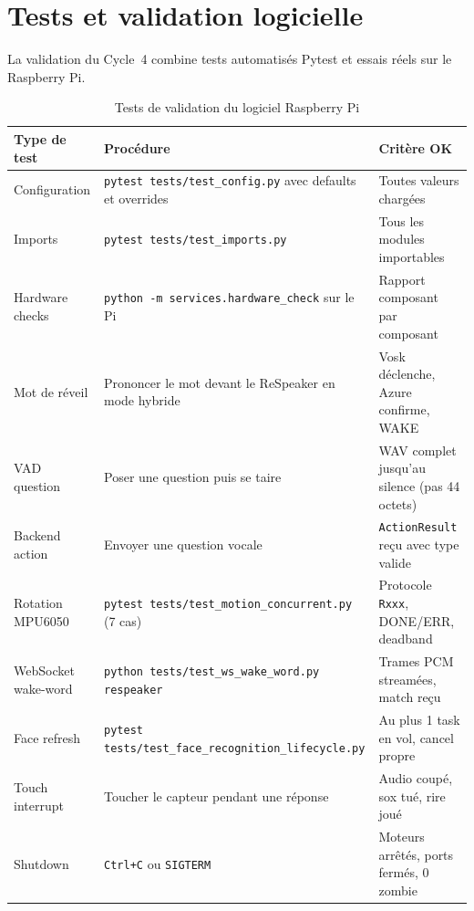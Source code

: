 \documentclass[a4paper,12pt]{report}
\begin{document}
	\section{Tests et validation logicielle}
	
	La validation du Cycle~4 combine tests automatisés Pytest et essais
	réels sur le Raspberry Pi.
	
	\begin{table}[H]
		\centering
		\caption{Tests de validation du logiciel Raspberry Pi}
		\label{tab:ch4-tests-logiciel}
		\renewcommand{\arraystretch}{1.25}
		\begin{tabularx}{\textwidth}{|>{\raggedright\arraybackslash}p{3.4cm}|>{\raggedright\arraybackslash}X|>{\raggedright\arraybackslash}p{3.4cm}|}
			\hline
			\textbf{Type de test} & \textbf{Procédure} & \textbf{Critère OK} \\
			\hline
			Configuration & \texttt{pytest tests/test\_config.py} avec defaults et overrides & Toutes valeurs chargées \\
			\hline
			Imports & \texttt{pytest tests/test\_imports.py} & Tous les modules importables \\
			\hline
			Hardware checks & \texttt{python -m services.hardware\_check} sur le Pi & Rapport composant par composant \\
			\hline
			Mot de réveil & Prononcer le mot devant le ReSpeaker en mode hybride & Vosk déclenche, Azure confirme, \textsc{WAKE} \\
			\hline
			VAD question & Poser une question puis se taire & WAV complet jusqu'au silence (pas 44 octets) \\
			\hline
			Backend action & Envoyer une question vocale & \texttt{ActionResult} reçu avec type valide \\
			\hline
			Rotation MPU6050 & \texttt{pytest tests/test\_motion\_concurrent.py} (7 cas) & Protocole \texttt{Rxxx}, DONE/ERR, deadband \\
			\hline
			WebSocket wake-word & \texttt{python tests/test\_ws\_wake\_word.py respeaker} & Trames PCM streamées, match reçu \\
			\hline
			Face refresh & \texttt{pytest tests/test\_face\_recognition\_lifecycle.py} & Au plus 1 task en vol, cancel propre \\
			\hline
			Touch interrupt & Toucher le capteur pendant une réponse & Audio coupé, sox tué, rire joué \\
			\hline
			Shutdown & \texttt{Ctrl+C} ou \texttt{SIGTERM} & Moteurs arrêtés, ports fermés, 0 zombie \\
			\hline
		\end{tabularx}
	\end{table}
	
\end{document}
